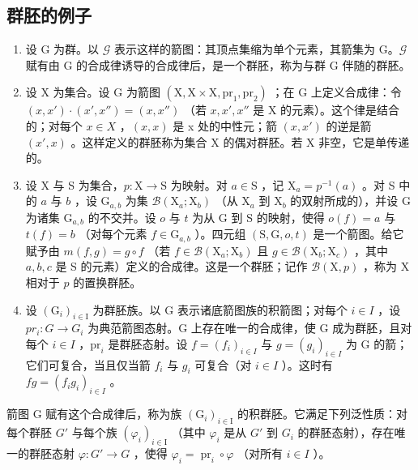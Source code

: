 \subsection{群胚的例子}

\begin{enumerate}
\def\labelenumi{\arabic{enumi})}
\item
  设 G 为群。以 \(\mathcal{G}\) 表示这样的箭图：其顶点集缩为单个元素，其箭集为 G。\(\mathcal{G}\) 赋有由 G 的合成律诱导的合成律后，是一个群胚，称为与群 G 伴随的群胚。
\item
  设 X 为集合。设 G 为箭图 \((\mathrm{X}, \mathrm{X} \times \mathrm{X}, \mathrm{pr}_{1}, \mathrm{pr}_{2})\) ；在 G 上定义合成律：令 \((x, x') \cdot (x', x'') = (x, x'')\) （若 \(x, x', x''\) 是 X 的元素）。这个律是结合的；对每个 \(x \in X\) ，\((x, x)\) 是 x 处的中性元；箭 \((x, x')\) 的逆是箭 \((x', x)\) 。这样定义的群胚称为集合 X 的偶对群胚。若 X 非空，它是单传递的。
\item
  设 X 与 S 为集合，\(p \colon \mathrm{X} \to \mathrm{S}\) 为映射。对 \(a \in \mathrm{S}\) ，记 \(\mathrm{X}_a = p^{-1}(a)\) 。对 S 中的 \(a\) 与 \(b\) ，设 \(\mathrm{G}_{a,b}\) 为集 \(\mathcal{B}(\mathrm{X}_a; \mathrm{X}_b)\) （从 \(\mathrm{X}_a\) 到 \(\mathrm{X}_b\) 的双射所成的），并设 G 为诸集 \(\mathrm{G}_{a,b}\) 的不交并。设 \(o\) 与 \(t\) 为从 G 到 S 的映射，使得 \(o(f) = a\) 与 \(t(f) = b\) （对每个元素 \(f \in \mathrm{G}_{a,b}\) ）。四元组 \((\mathrm{S}, \mathrm{G}, o, t)\) 是一个箭图。给它赋予由 \(m(f, g) = g \circ f\) （若 \(f \in \mathcal{B}(\mathrm{X}_a; \mathrm{X}_b)\) 且 \(g \in \mathcal{B}(\mathrm{X}_b; \mathrm{X}_c)\) ，其中 \(a, b, c\) 是 S 的元素）定义的合成律。这是一个群胚；记作 \(\mathcal{B}(\mathrm{X}, p)\) ，称为 X 相对于 \(p\) 的置换群胚。
\item
  设 \((\mathrm{G}_{i})_{i\in\mathrm{I}}\) 为群胚族。以 G 表示诸底箭图族的积箭图；对每个 \(i\in I\) ，设 \(pr_{i}\colon G\to G_{i}\) 为典范箭图态射。G 上存在唯一的合成律，使 G 成为群胚，且对每个 \(i \in I\) ，\(\mathrm{pr}_i\) 是群胚态射。设 \(f = (f_i)_{i \in I}\) 与 \(g = (g_i)_{i \in I}\) 为 G 的箭；它们可复合，当且仅当箭 \(f_i\) 与 \(g_i\) 可复合（对 \(i \in I\) ）。这时有 \(fg = (f_i g_i)_{i \in I}\) 。
\end{enumerate}

箭图 G 赋有这个合成律后，称为族 \((\mathrm{G}_{i})_{i\in\mathrm{I}}\) 的积群胚。它满足下列泛性质：对每个群胚 \(G'\) 与每个族 \((\varphi_{i})_{i\in\mathrm{I}}\) （其中 \(\varphi_{i}\) 是从 \(G'\) 到 \(G_{i}\) 的群胚态射），存在唯一的群胚态射 \(\varphi: G'\to G\) ，使得 \(\varphi_{i}=\operatorname{pr}_{i}\circ\varphi\) （对所有 \(i\in I\) ）。

